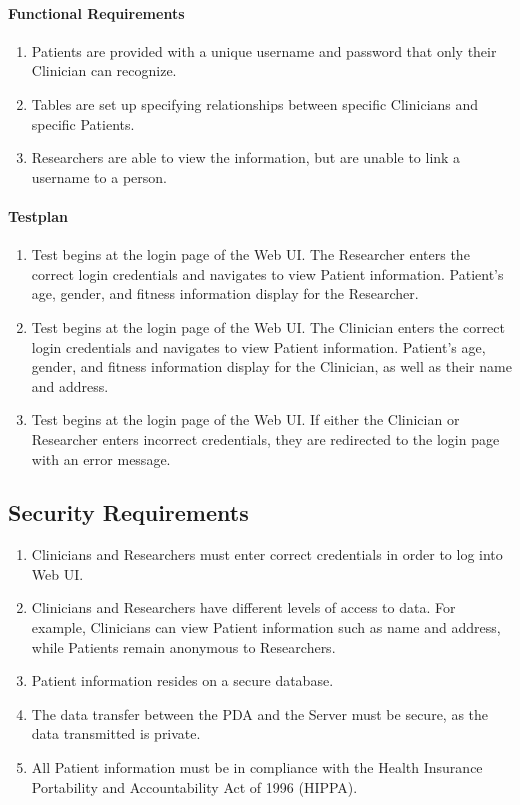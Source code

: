 \documentclass{article}
\begin{document}
\paragraph{Functional Requirements}
\begin{enumerate}
\item Patients are provided with a unique username and password that only their Clinician can recognize.
\item Tables are set up specifying relationships between specific Clinicians and specific Patients.
\item Researchers are able to view the information, but are unable to link a username to a person.
\end{enumerate}

\paragraph{Testplan}
\begin{enumerate}
\item Test begins at the login page of the Web UI.  The Researcher enters the correct login credentials and navigates to view Patient information.  Patient's age, gender, and fitness information display for the Researcher.
\item Test begins at the login page of the Web UI.  The Clinician enters the correct login credentials and navigates to view Patient information.  Patient's age, gender, and fitness information display for the Clinician, as well as their name and address.
\item Test begins at the login page of the Web UI.  If either the Clinician or Researcher enters incorrect credentials, they are redirected to the login page with an error message.
\end{enumerate}

\subsection{Security Requirements }
\begin{enumerate}
\item Clinicians and Researchers must enter correct credentials in order to log into Web UI.
\item Clinicians and Researchers have different levels of access to data.  For example, Clinicians can view Patient information such as name and address, while Patients remain anonymous to Researchers.
\item Patient information resides on a secure database.
\item The data transfer between the PDA and the Server must be secure, as the data transmitted is private.
\item All Patient information must be in compliance with the Health Insurance Portability and Accountability Act of 1996 (HIPPA).
\end{enumerate}
\end{document}
